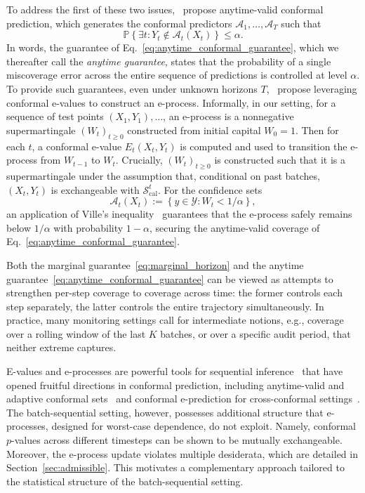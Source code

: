 \documentclass{uai2026} %
\newcommand{\1}{\mathbf{1}}
\newcommand{\prob}{\mathbb{P}}
\newcommand{\ycal}{\mathcal{Y}}
\newcommand{\scal}{\mathcal{S}}
\newcommand{\ens}[1]{\left\{#1\right\}}
\newcommand{\cali}{\mathrm{cal}}
\newcommand{\scalcal}{\scal_{\cali}}
\newcommand{\acal}{\mathcal{A}}
\begin{document}
To address the first of these two issues,~\citet{gauthier2025values} propose anytime-valid conformal prediction, which generates the conformal predictors $\acal_1, \ldots, \acal_T$ such that
\begin{equation}
  \label{eq:anytime_conformal_guarantee}
  \prob\ens{\exists t: Y_t\not\in \acal_t(X_t)} \le \alpha.
\end{equation}
In words, the guarantee of Eq.~\ref{eq:anytime_conformal_guarantee}, which we thereafter call the \emph{anytime guarantee}, states that the probability of a single miscoverage error across the entire sequence of predictions is controlled at level $\alpha$. To provide such guarantees, even under unknown horizons $T$,~\citet{gauthier2025values} propose leveraging conformal e-values to construct an e-process. Informally, in our setting, for a sequence of test points $(X_1, Y_1), \ldots$, an e-process is a nonnegative supermartingale $(W_t)_{t\ge 0}$ constructed from initial capital $W_0=1$. Then for each $t$, a conformal e-value $E_t(X_t, Y_t)$ is computed and used to transition the e-process from $W_{t-1}$ to $W_t$. Crucially, $(W_t)_{t\ge 0}$ is constructed such that it is a supermartingale under the assumption that, conditional on past batches, $(X_t,Y_t)$ is exchangeable with $\scalcal^t$. For the confidence sets
\begin{equation*}
  \acal_t(X_t) := \ens{y \in \ycal : W_{t} < 1/\alpha},
\end{equation*}
an application of Ville's inequality~\citep{ville1939etude} guarantees that the e-process safely remains below $1/\alpha$ with  probability $1-\alpha$, securing the anytime-valid coverage of Eq.~\eqref{eq:anytime_conformal_guarantee}.

Both the marginal guarantee~\eqref{eq:marginal_horizon} and the anytime guarantee~\eqref{eq:anytime_conformal_guarantee} can be viewed as attempts to strengthen per-step coverage to coverage across time: the former controls each step separately, the latter controls the entire trajectory simultaneously.
In practice, many monitoring settings call for intermediate notions, e.g., coverage over a rolling window of the last $K$ batches, or over a specific audit period, that neither extreme captures.

E-values and e-processes are powerful tools for sequential inference~\citep{shafer2011test,ramdas2023game,ramdas2025hypothesis} that have opened fruitful directions in conformal prediction, including anytime-valid and adaptive conformal sets~\citep{gauthier2025values,gauthier2026adaptive} and conformal e-prediction for cross-conformal settings~\citep{vovk2025conformal}.
The batch-sequential setting, however, possesses additional structure that e-processes, designed for worst-case dependence, do not exploit.  Namely, conformal $p$-values across different timesteps can be shown to be mutually exchangeable.  Moreover, the e-process update violates multiple desiderata, which are detailed in Section~\ref{sec:admissible}. This motivates a complementary approach tailored to the statistical structure of the batch-sequential setting.
\end{document}
